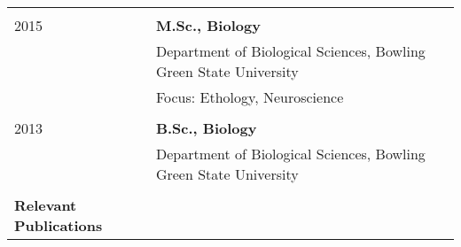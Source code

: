 \documentclass[letterpaper,10pt,oneside]{article}
\newcommand{\tabitem}{\hspace{2mm}\textbullet\hspace{2mm}}
\begin{document}
\begin{small}
\begin{longtable}{@{} l p{5in}l}
     
     & \\
 \large{2015} 
  & \textbf{M.Sc., Biology} \\
      & {Department of Biological Sciences, Bowling Green State University} \\
    &  \tabitem Focus: Ethology, Neuroscience \\

    
     & \\
 \large{2013} 
  &\textbf{B.Sc., Biology} \\
      &  {Department of Biological Sciences, Bowling Green State University} \\
    
     & \vspace{5mm}\\
 \Large{\textbf{Relevant Publications}}  \vspace{2mm} \\


\end{longtable}
\end{small}
\end{document}
